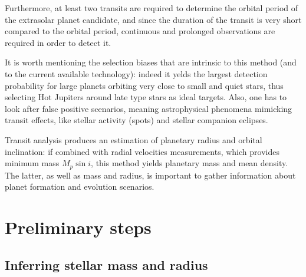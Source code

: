 \documentclass{aa}
\begin{document}
Furthermore, at least two transits are required to determine the orbital period of the extrasolar planet candidate, and since the duration of the transit is very short compared to the orbital period, continuous and prolonged observations are required in order to detect it.

It is worth mentioning the selection biases that are intrinsic to this method (and to the current available technology): indeed it yelds the largest detection probability for large planets orbiting very close to small and quiet stars, thus selecting Hot Jupiters around late type stars as ideal targets. Also, one has to look after false positive scenarios, meaning astrophysical phenomena mimicking transit effects, like stellar activity (spots) and stellar companion eclipses.

Transit analysis produces an estimation of planetary radius and orbital inclination: if combined with radial velocities measurements, which provides minimum mass $M_p\sin{i}$, this method yields planetary mass and mean density. The latter, as well as mass and radius, is important to gather information about planet formation and evolution scenarios.




\section{Preliminary steps}

\subsection{Inferring stellar mass and radius}
\end{document}
